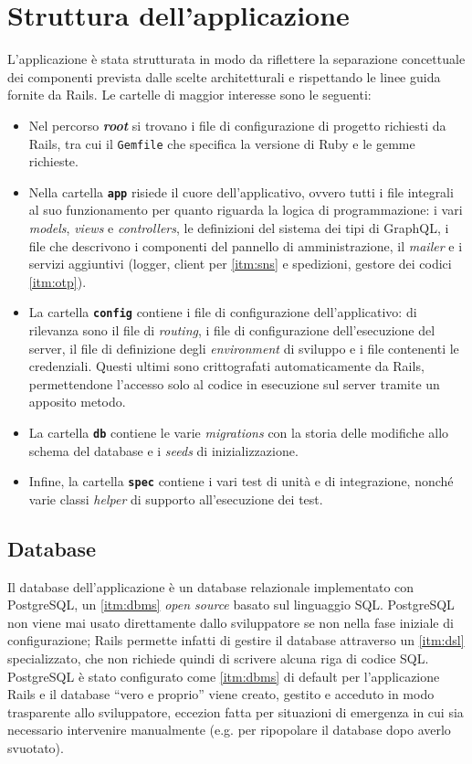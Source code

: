 \section{Struttura dell'applicazione}
L'applicazione è stata strutturata in modo da riflettere la separazione concettuale dei componenti prevista dalle scelte architetturali e rispettando le linee guida fornite da Rails. Le cartelle di maggior interesse sono le seguenti:
\begin{itemize}
    \item Nel percorso \textbf{\textit{root}} si trovano i file di configurazione di progetto richiesti da Rails, tra cui il \texttt{Gemfile} che specifica la versione di Ruby e le gemme richieste.
    \item Nella cartella \textbf{\texttt{app}} risiede il cuore dell'applicativo, ovvero tutti i file integrali al suo funzionamento per quanto riguarda la logica di programmazione: i vari \textit{models}, \textit{views} e \textit{controllers}, le definizioni del sistema dei tipi di GraphQL, i file che descrivono i componenti del pannello di amministrazione, il \textit{mailer} e i servizi aggiuntivi (logger, client per \ref{itm:sns} e spedizioni, gestore dei codici \ref{itm:otp}).
    \item La cartella \textbf{\texttt{config}} contiene i file di configurazione dell'applicativo: di rilevanza sono il file di \textit{routing}, i file di configurazione dell'esecuzione del server, il file di definizione degli \textit{environment} di sviluppo e i file contenenti le credenziali. Questi ultimi sono crittografati automaticamente da Rails, permettendone l'accesso solo al codice in esecuzione sul server tramite un apposito metodo.
    \item La cartella \textbf{\texttt{db}} contiene le varie \textit{migrations} con la storia delle modifiche allo schema del database e i \textit{seeds} di inizializzazione.
    \item Infine, la cartella \textbf{\texttt{spec}} contiene i vari test di unità e di integrazione, nonché varie classi \textit{helper} di supporto all'esecuzione dei test. 
\end{itemize}
\vspace{-15pt}
\subsection{Database}
Il database dell'applicazione è un database relazionale implementato con PostgreSQL, un \ref{itm:dbms} \textit{open source} basato sul linguaggio SQL. PostgreSQL non viene mai usato direttamente dallo sviluppatore se non nella fase iniziale di configurazione; Rails permette infatti di gestire il database attraverso un \ref{itm:dsl} specializzato, che non richiede quindi di scrivere alcuna riga di codice SQL. PostgreSQL è stato configurato come \ref{itm:dbms} di default per l'applicazione Rails e il database ``vero e proprio'' viene creato, gestito e acceduto in modo trasparente allo sviluppatore, eccezion fatta per situazioni di emergenza in cui sia necessario intervenire manualmente (e.g. per ripopolare il database dopo averlo svuotato).
